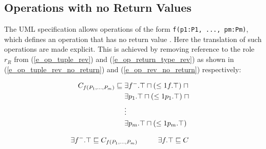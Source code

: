 \subsection{Operations with no Return Values} \label{subsec_Operations with no Return Values}
The UML specification allows operations of the form \texttt{f(p1:P1, ..., pm:Pm)}, which defines an operation that has no return value \cite{ISO-UMLSuper2.4.1}. Here the translation of 
such operations are made explicit. This is achieved by removing reference to the role $r_R$ from (\ref{e_op_tuple_rev}) and (\ref{e_op_return_type_rev}) as shown in (\ref{e_op_tuple_rev_no_return}) 
and (\ref{e_op_rev_no_return}) respectively:

    \begin{equation} \label{e_op_tuple_rev_no_return}
      \begin{split}
  	C_{f(P_1, ..., P_m)} \sqsubseteq \hspace*{1mm}& \exists f^-.\top \sqcap (\leq 1 f.\top) \hspace*{1mm} \sqcap \\
  	 \hspace*{1mm}& \exists p_1.\top \sqcap (\leq 1 p_1.\top) \hspace*{1mm} \sqcap \\
  	\hspace*{1mm}& \vdots  \\
  	\hspace*{1mm}& \exists p_m.\top \sqcap (\leq 1 p_m.\top) \hspace*{1mm}
    \end{split}
    \end{equation}
    
    \begin{equation} \label{e_op_rev_no_return}
      \begin{split}
	\exists f^-.\top &\sqsubseteq C_{f(P_1, ..., P_m)}   \hspace*{1cm}  \exists f.\top \sqsubseteq C 
      \end{split}
    \end{equation}

